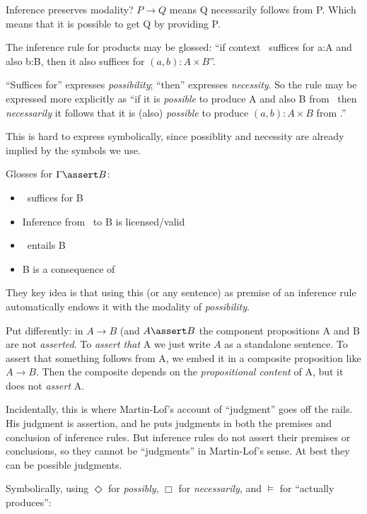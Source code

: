 \documentclass{article}
\begin{document}
Inference preserves modality? \(P\rightarrow Q\) means Q necessarily
follows from P. Which means that it is possible to get Q by
providing P.

The inference rule for products may be glossed: ``if
context \ContextG\ suffices for a:A and also b:B, then it also suffices for \( (a,b):A\times B\)''.

``Suffices for'' expresses \textit{possibility}; ``then'' expresses
\textit{necessity}. So the rule may be expressed more explicitly as
``if it is \textit{possible} to produce A and also B from \Gamma\,
then \textit{necessarily} it follows that it is (also)
\textit{possible} to produce \( (a,b):A\times B \) from \Gamma.''

This is hard to express symbolically, since possiblity and necessity
are already implied by the symbols we use.

Glosses for \(\Gamma\linfer B\):

\begin{itemize}
\item \Gamma\ suffices for B
\item Inference from \Gamma\ to B is licensed/valid
\item \Gamma\ entails B
\item B is a consequence of \Gamma
\end{itemize}

They key idea is that using this (or any sentence) as premise of an
inference rule automatically endows it with the modality of
\textit{possibility}.

Put differently: in \(A\rightarrow B\) (and \(A\linfer B\) the
component propositions A and B are not \textit{asserted}. To
\textit{assert that} A we just write \(A\) as a standalone sentence.
To assert that something follows from A, we embed it in a composite
proposition like \(A\rightarrow B\). Then the composite depends on the
\textit{propositional content} of A, but it does not \textit{assert}
A.

Incidentally, this is where Martin-Lof's account of ``judgment'' goes
off the rails. His judgment is assertion, and he puts judgments in
both the premises and conclusion of inference rules. But inference
rules do not assert their premises or conclusions, so they cannot be
``judgments'' in Martin-Lof's sense. At best they can be possible
judgments.

Symbolically, using \( \Diamond \) for \textit{possibly}, \(\Box\)
for \textit{necessarily}, and \(\models\) for ``actually produces'':
\end{document}
